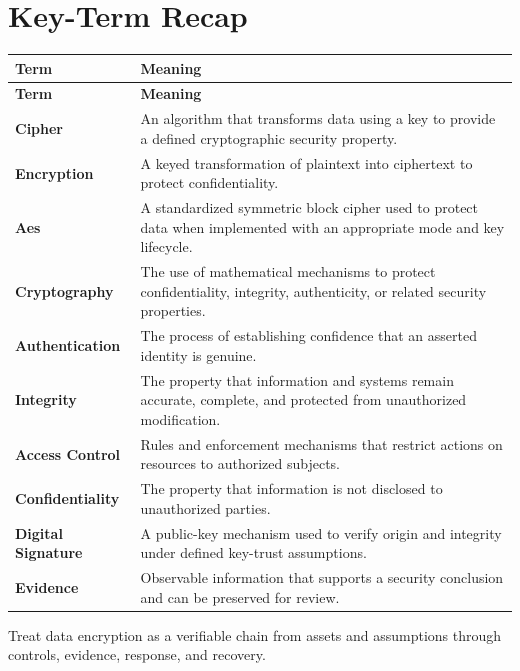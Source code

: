 \documentclass[11pt]{article}
\begin{document}
\section*{Key-Term Recap}
\begin{longtable}{>{\RaggedRight\arraybackslash}p{}>{\RaggedRight\arraybackslash}p{}}
\toprule\rowcolor{Navy}\color{white}\textbf{Term} & \color{white}\textbf{Meaning}\\\midrule
\endfirsthead
\toprule\rowcolor{Navy}\color{white}\textbf{Term} & \color{white}\textbf{Meaning}\\\midrule
\endhead
\textbf{Cipher} & An algorithm that transforms data using a key to provide a defined cryptographic security property. \\\midrule
\textbf{Encryption} & A keyed transformation of plaintext into ciphertext to protect confidentiality. \\\midrule
\textbf{Aes} & A standardized symmetric block cipher used to protect data when implemented with an appropriate mode and key lifecycle. \\\midrule
\textbf{Cryptography} & The use of mathematical mechanisms to protect confidentiality, integrity, authenticity, or related security properties. \\\midrule
\textbf{Authentication} & The process of establishing confidence that an asserted identity is genuine. \\\midrule
\textbf{Integrity} & The property that information and systems remain accurate, complete, and protected from unauthorized modification. \\\midrule
\textbf{Access Control} & Rules and enforcement mechanisms that restrict actions on resources to authorized subjects. \\\midrule
\textbf{Confidentiality} & The property that information is not disclosed to unauthorized parties. \\\midrule
\textbf{Digital Signature} & A public-key mechanism used to verify origin and integrity under defined key-trust assumptions. \\\midrule
\textbf{Evidence} & Observable information that supports a security conclusion and can be preserved for review. \\\midrule
\bottomrule
\end{longtable}
\begin{takeawaybox}
Treat data encryption as a verifiable chain from assets and assumptions through controls, evidence, response, and recovery.
\end{takeawaybox}
\end{document}
